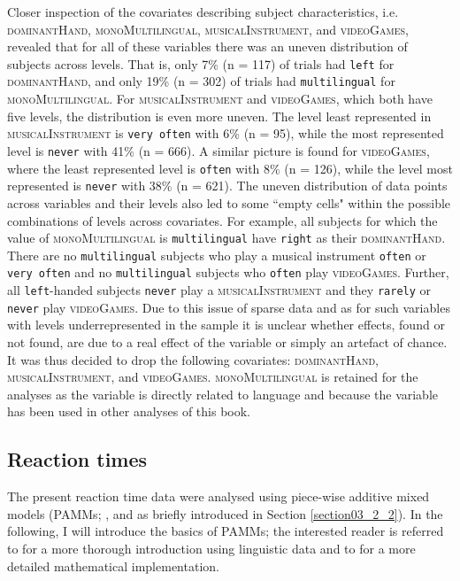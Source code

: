 Closer inspection of the covariates describing subject characteristics, i.e. \textsc{dominantHand}, \textsc{monoMultilingual}, \textsc{musicalInstrument}, and \textsc{videoGames}, revealed that for all of these variables there was an uneven distribution of subjects across levels. That is, only 7\% (n = 117) of trials had \texttt{left} for \textsc{dominantHand}, and only 19\% (n = 302) of trials had \texttt{multilingual} for \textsc{monoMultilingual}. For \textsc{musicalInstrument} and \textsc{videoGames}, which both have five levels, the distribution is even more uneven. The level least represented in \textsc{musicalInstrument} is \texttt{very often} with 6\% (n = 95), while the most represented level is \texttt{never} with 41\% (n = 666). A similar picture is found for \textsc{videoGames}, where the least represented level is \texttt{often} with 8\% (n = 126), while the level most represented is \texttt{never} with 38\% (n = 621). The uneven distribution of data points across variables and their levels also led to some ``empty cells" within the possible combinations of levels across covariates. For example, all subjects for which the value of \textsc{monoMultilingual} is \texttt{multilingual} have \texttt{right} as their \textsc{dominantHand}. There are no \texttt{multilingual} subjects who play a musical instrument \texttt{often} or \texttt{very often} and no \texttt{multilingual} subjects who \texttt{often} play \textsc{videoGames}. Further, all \texttt{left}-handed subjects \texttt{never} play a \textsc{musicalInstrument} and they \texttt{rarely} or \texttt{never} play \textsc{videoGames}. Due to this issue of sparse data and as for such variables with levels underrepresented in the sample it is unclear whether effects, found or not found, are due to a real effect of the variable or simply an artefact of chance. It was thus decided to drop the following covariates: \textsc{dominantHand}, \textsc{musicalInstrument}, and \textsc{videoGames}. \textsc{monoMultilingual} is retained for the analyses as the variable is directly related to language and because the variable has been used in other analyses of this book.

\subsection{Reaction times}\label{section07_2_2}

The present reaction time data were analysed using piece-wise additive mixed models (PAMMs; \cite{Bender2018etal}, and as briefly introduced in Section \ref{section03_2_2}). In the following, I will introduce the basics of PAMMs; the interested reader is referred to \citet{Hendrix2020} for a more thorough introduction using linguistic data and to \citet{Bender2018etal} for a more detailed mathematical implementation. 

